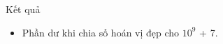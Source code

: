 Kết quả  
\begin{itemize}
	\item     Phần dư khi chia số hoán vị đẹp cho $10^{9}$    + 7.   
\end{itemize}